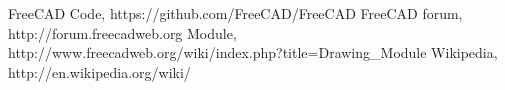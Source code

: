 \begin{thebibliography}{9}
\bibitem{} FreeCAD Code, https://github.com/FreeCAD/FreeCAD
\bibitem{} FreeCAD forum, http://forum.freecadweb.org
\bibitem{} Module, http://www.freecadweb.org/wiki/index.php?title=Drawing\_Module
\bibitem{} Wikipedia, http://en.wikipedia.org/wiki/
\end{thebibliography}
